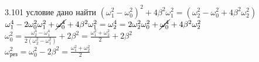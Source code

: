 \testCom
{%
	3.101
}
{%
	условие
}
{%
	дано
}
{%
	найти
}
{%
	$(\omega_1^2 - \omega_0^2)^2 + 4 \beta^2 \omega_1^2 = (\omega_2^2 - \omega_0^2 + 4 \beta^2 \omega_2^2)$\\
	$\omega_1^4 - 2 \omega_0^2 \omega_1^2 + \cancel{\omega_0^4} + 4 \beta^2 \omega_1^2 = \omega_2^4 = 2 \omega_2^2 \omega_0^2 +\cancel{\omega_0^4} + 4 \beta^2 \omega_2^2$\\
	$\omega_0^2 = \frac{\omega_2^4 - \omega_1^4}{2 (\omega_2^2 - \omega_1^2)} + 2 \beta^2 = \frac{\omega_1^2 + \omega_2^2}{2} + 2 \beta^2$\\
	$\omega_{рез}^2 = \omega_0^2 - 2 \beta^2 = \frac{\omega_1^2 + \omega_2^2}{2}$\\
}

